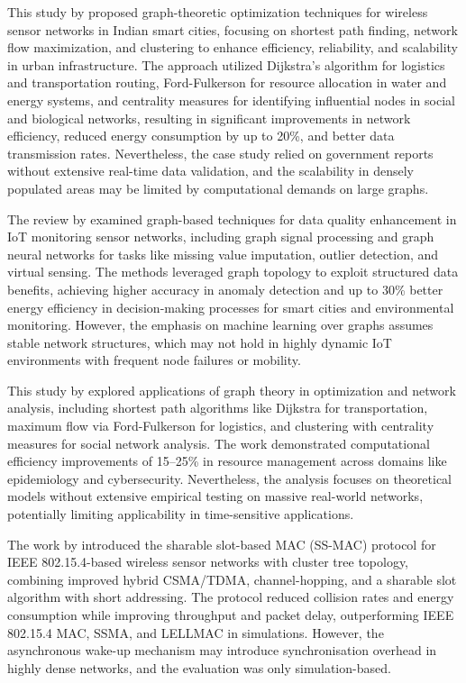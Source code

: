 \documentclass[a4paper,fleqn]{cas-dc}
\numberwithin{equation}{section}
\begin{document}
This study by \cite{B1} proposed graph-theoretic optimization techniques for wireless sensor networks in Indian smart cities, focusing on shortest path finding, network flow maximization, and clustering to enhance efficiency, reliability, and scalability in urban infrastructure. The approach utilized Dijkstra's algorithm for logistics and transportation routing, Ford-Fulkerson for resource allocation in water and energy systems, and centrality measures for identifying influential nodes in social and biological networks, resulting in significant improvements in network efficiency, reduced energy consumption by up to 20\%, and better data transmission rates. Nevertheless, the case study relied on government reports without extensive real-time data validation, and the scalability in densely populated areas may be limited by computational demands on large graphs.

The review by \cite{B2} examined graph-based techniques for data quality enhancement in IoT monitoring sensor networks, including graph signal processing and graph neural networks for tasks like missing value imputation, outlier detection, and virtual sensing. The methods leveraged graph topology to exploit structured data benefits, achieving higher accuracy in anomaly detection and up to 30\% better energy efficiency in decision-making processes for smart cities and environmental monitoring. However, the emphasis on machine learning over graphs assumes stable network structures, which may not hold in highly dynamic IoT environments with frequent node failures or mobility.

This study by \cite{B3} explored applications of graph theory in optimization and network analysis, including shortest path algorithms like Dijkstra for transportation, maximum flow via Ford-Fulkerson for logistics, and clustering with centrality measures for social network analysis. The work demonstrated computational efficiency improvements of 15--25\% in resource management across domains like epidemiology and cybersecurity. Nevertheless, the analysis focuses on theoretical models without extensive empirical testing on massive real-world networks, potentially limiting applicability in time-sensitive applications.

The work by \cite{B4} introduced the sharable slot-based MAC (SS-MAC) protocol for IEEE 802.15.4-based wireless sensor networks with cluster tree topology, combining improved hybrid CSMA/TDMA, channel-hopping, and a sharable slot algorithm with short addressing. The protocol reduced collision rates and energy consumption while improving throughput and packet delay, outperforming IEEE 802.15.4 MAC, SSMA, and LELLMAC in simulations. However, the asynchronous wake-up mechanism may introduce synchronisation overhead in highly dense networks, and the evaluation was only simulation-based.
\end{document}

